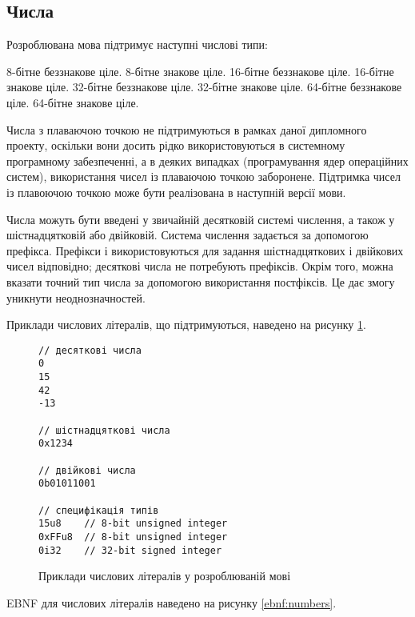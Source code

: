 \documentclass[main.tex]{subfiles}
\begin{document}
\FloatBarrier
\subsection{Числа}
Розроблювана мова підтримує наступні числові типи:
\begin{itemize}[nosep]
 8-бітне беззнакове ціле.
 8-бітне знакове ціле.
 16-бітне беззнакове ціле.
 16-бітне знакове ціле.
 32-бітне беззнакове ціле.
 32-бітне знакове ціле.
 64-бітне беззнакове ціле.
 64-бітне знакове ціле.
\end{itemize}

Числа з плаваючою точкою не підтримуються в рамках даної дипломного проекту, оскільки вони досить рідко використовуються в системному програмному забезпеченні, а в деяких випадках (програмування ядер операційних систем), використання чисел із плаваючою точкою заборонене.
Підтримка чисел із плавоючою точкою може бути реалізована в наступній версії мови.

Числа можуть бути введені у звичайній десятковій системі числення, а також у шістнадцятковій або двійковій.
Система числення задається за допомогою префікса.
Префікси  і  використовуються для задання шістнадцяткових і двійкових чисел відповідно; десяткові числа не потребують префіксів.
Окрім того, можна вказати точний тип числа за допомогою використання постфіксів.
Це дає змогу уникнути неоднозначностей.

Приклади числових літералів, що підтримуються, наведено на рисунку \ref{lang:literals:numbers}.

\begin{figure}[h]
  \centering
  \begin{verbatim}
// десяткові числа
0
15
42
-13

// шістнадцяткові числа
0x1234

// двійкові числа
0b01011001

// специфікація типів
15u8    // 8-bit unsigned integer
0xFFu8  // 8-bit unsigned integer
0i32    // 32-bit signed integer
  \end{verbatim}
  \caption{Приклади числових літералів у розроблюваній мові}
  \label{lang:literals:numbers}
\end{figure}

EBNF для числових літералів наведено на рисунку \ref{ebnf:numbers}.
\end{document}
